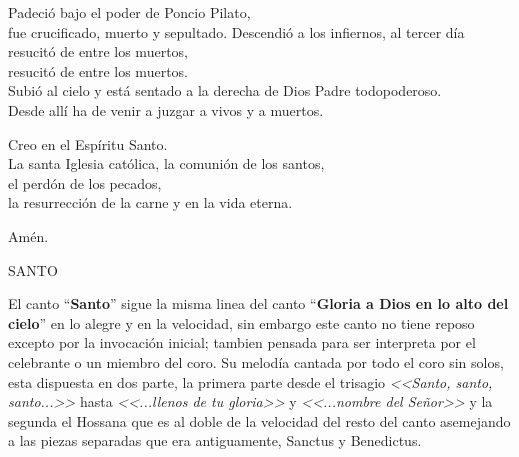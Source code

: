 \documentclass[12pt, letterpaper]{report}
\begin{document}
    \noindent
    Padeci\'o bajo el poder de Poncio Pilato,\\
    fue crucificado, muerto y sepultado. Descendi\'o a los infiernos, al tercer d\'ia resucit\'o de entre los muertos,\\
    resucit\'o de entre los muertos.\\
    Subi\'o al cielo y est\'a sentado a la derecha de Dios Padre todopoderoso.\\
    Desde all\'i ha de venir a juzgar a vivos y a muertos.

    \noindent
    Creo en el Esp\'iritu Santo.\\
    La santa Iglesia cat\'olica, la comuni\'on de los santos,\\
    el perd\'on de los pecados,\\
    la resurrecci\'on de la carne y en la vida eterna.

    \noindent
    Am\'en.
    \clearpage




    \begin{center}
      {\large SANTO}
    \end{center}

    El canto ``\textbf{Santo}'' sigue la misma linea del canto ``\textbf{Gloria a Dios en lo alto del cielo}'' en lo alegre y en la velocidad, sin embargo este canto no tiene reposo excepto por la invocaci\'on inicial; tambien pensada para ser interpreta por el celebrante o un miembro del coro. Su melod\'ia cantada por todo el coro sin solos, esta dispuesta en dos parte, la primera parte desde el trisagio \textit{<<Santo, santo, santo...>>} hasta \textit{<<...llenos de tu gloria>>} y \textit{<<...nombre del Se\~nor>>} y la segunda el Hossana que es al doble de la velocidad del resto del canto asemejando a las piezas separadas que era antiguamente, Sanctus y Benedictus.
\end{document}
